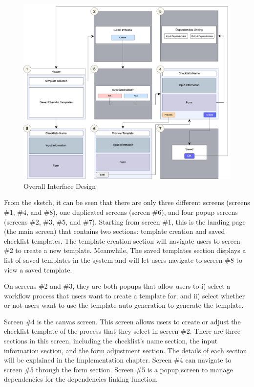 \begin{figure}[ht!]
    \centering
    \includegraphics[width=\textwidth]{overleaf/images/overall_interface_design.png}
    \caption{Overall Interface Design}
    \label{fig:overall_interface_design}
\end{figure}

From the sketch, it can be seen that there are only three different screens (screens \#1, \#4, and \#8), one duplicated screens (screen \#6), and four popup screens (screens \#2, \#3, \#5, and \#7). Starting from screen \#1, this is the landing page (the main screen) that contains two sections: template creation and saved checklist templates. The template creation section will navigate users to screen \#2 to create a new template. Meanwhile, The saved templates section displays a list of saved templates in the system and will let users navigate to screen \#8 to view a saved template.

On screens \#2 and \#3, they are both popups that allow users to i) select a workflow process that users want to create a template for; and ii) select whether or not users want to use the template auto-generation to generate the template.

Screen \#4 is the canvas screen. This screen allows users to create or adjust the checklist template of the process that they select in screen \#2. There are three sections in this screen, including the checklist's name section, the input information section, and the form adjustment section. The details of each section will be explained in the Implementation chapter.
Screen \#4 can navigate to screen \#5 through the form section. Screen \#5 is a popup screen to manage dependencies for the dependencies linking function.

